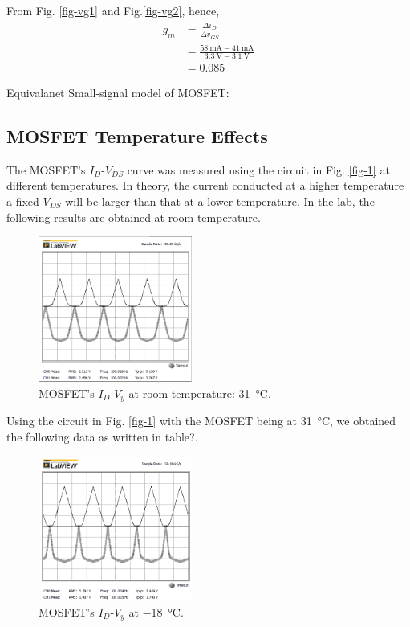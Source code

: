 \documentclass[journal]{IEEEtran}
\begin{document}
\par From Fig. \ref{fig-vg1} and Fig.\ref{fig-vg2}, hence,
\begin{equation*}
  \begin{split}
  g_{m}&=\frac{\Delta i_{D}}{\Delta v_{GS}}\\
  &=\frac{\SI{58}{\mA}-\SI{41}{\mA}}{\SI{3.3}{\V}-\SI{3.1}{\V}}\\
  &=0.085
\end{split}
\end{equation*}
\par Equivalanet Small-signal model of MOSFET:

\subsection{MOSFET Temperature Effects}
\par The MOSFET’s $I_{D}$-$V_{DS}$ curve was measured using the circuit in Fig. \ref{fig-1}
at different temperatures. In theory, the current conducted at a higher temperature
a fixed $V_{DS}$ will be larger than that at a lower temperature. In the lab, the
following results are obtained at room temperature.
\begin{figure}[h]
  \centering
  \includegraphics[width=0.45\textwidth]{images/2-1.png}
  \caption{MOSFET’s $I_{D}$-$V_{y}$ at room temperature: \SI{31}{\celsius}.}
  \label{fig-5}
\end{figure}
\par Using the circuit in  Fig. \ref{fig-1} with the MOSFET being at \SI{31}{\celsius},
we obtained the following data as written in table?.
\begin{figure}[h]
  \centering
  \includegraphics[width=0.45\textwidth]{images/2-2.png}
  \caption{MOSFET’s $I_{D}$-$V_{y}$ at \SI{-18}{\celsius}.}
  \label{fig-6}
\end{figure}
\end{document}
